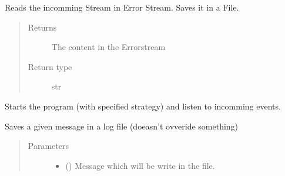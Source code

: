 \documentclass[letterpaper,10pt,english]{sphinxmanual}
\begin{document}
\begin{fulllineitems}
\begin{fulllineitems}
\label{\detokenize{anoog.automation:anoog.automation.py_exe_interface.Process_Interface.read_err}}
\sphinxAtStartPar
Reads the incomming Stream in Error Stream.
Saves it in a File.
\begin{quote}\begin{description}
\item[{Returns}] \leavevmode
\sphinxAtStartPar
The content in the Errorstream

\item[{Return type}] \leavevmode
\sphinxAtStartPar
str

\end{description}\end{quote}

\end{fulllineitems}


\begin{fulllineitems}
\label{\detokenize{anoog.automation:anoog.automation.py_exe_interface.Process_Interface.run}}
\sphinxAtStartPar
Starts the program (with specified strategy) and listen to incomming events.

\end{fulllineitems}


\begin{fulllineitems}
\label{\detokenize{anoog.automation:anoog.automation.py_exe_interface.Process_Interface.save_in_file}}
\sphinxAtStartPar
Saves a given message in a log file (doeasn’t ovveride something)
\begin{quote}\begin{description}
\item[{Parameters}] \leavevmode\begin{itemize}
\item {} 
\sphinxAtStartPar
{} (\sphinxstyleliteralemphasis{\sphinxupquote{, }}) \textendash{} Message which will be write in the file.


\end{itemize}
\end{description}
\end{quote}
\end{fulllineitems}
\end{fulllineitems}
\end{document}
